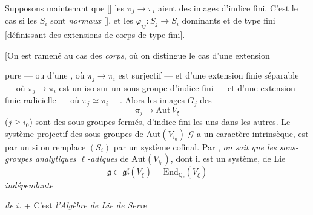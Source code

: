 \documentclass[11pt,a4paper]{article}
\begin{document}
Supposons maintenant que [] les
 $\pi_{j} \to \pi_{i}$ aient des images
d'indice fini. C'est le cas si les $S_{i}$ sont \emph{normaux}
[], et les $\varphi_{ij} : S_{j} \to S_{i}$ dominants et
de type fini [définissant des extensions de corps de type fini].

[On est ramené au cas des \emph{corps}, où on distingue le cas d'une
extension 

pure --- ou d'une \ill{}  , où
$\pi_{j} \to \pi_{i}$ est surjectif --- et d'une extension finie séparable
--- où $\pi_{j} \to \pi_{i}$ est un iso sur un sous-groupe d'indice fini
--- et d'une extension finie radicielle --- où $\pi_{j} \simeq \pi_{i}$
---. Alors les images $G_{j}$ des
\[
\pi_{j} \longrightarrow \mathrm{Aut}\,V_{\xi}
\]
($j \geqslant i_{0}$) sont des sous-groupes fermés, \struck{\ill{}}
d'indice fini les uns dans les autres. Le système projectif des
sous-groupes de $\mathrm{Aut}(V_{i_{0}})$ \struck{\ill{}} $\mathcal{G}$ a
un caractère intrinsèque, est  par un
 si on remplace $(S_{i})$ par un système cofinal.
Par , \emph{on sait que les sous-groupes analytiques
$\ell$-adiques} de $\mathrm{Aut}(V_{i_{0}})$, dont il est un système, de
Lie
\[
\mathfrak{g} \subset \mathfrak{gl}(V_{\xi}) = \mathrm{End}_{\mathbb{Q}_{\ell}}(V_{\xi})
\]
\emph{indépendante}

\emph{de $i$}.  + C'est \emph{l'Algèbre de Lie de Serre}
\end{document}
